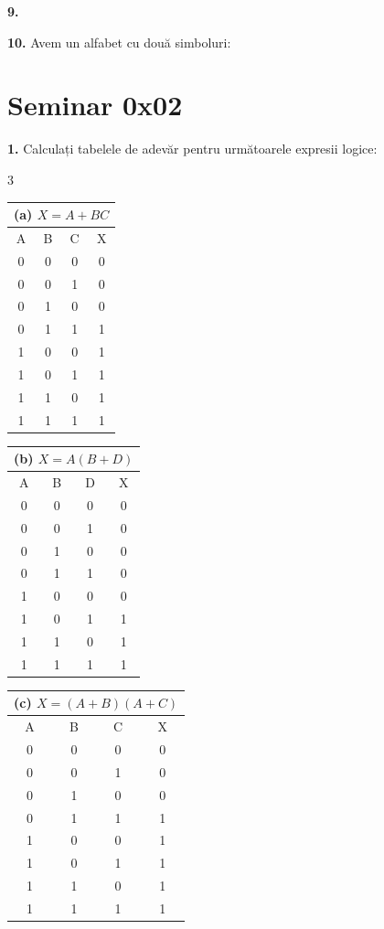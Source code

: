 \documentclass[a4paper]{article}
\renewcommand{\arraystretch}{1.4}
\newenvironment{definition}[1]
    {\begin{definitionbox}[frametitle={#1}]}
    {\end{definitionbox}}
\begin{document}
\textbf{9.}


\textbf{10.} Avem un alfabet cu două simboluri:
%


\section{Seminar 0x02}
\textbf{1.} Calculați tabelele de adevăr pentru următoarele expresii logice:
\begin{multicols}{3}

\renewcommand{\arraystretch}{0.9}
\setlength{\tabcolsep}{6pt}
\centering

\begin{tabular}{|c|c|c||c|}
\multicolumn{4}{|c|}{(a) $X = A + BC$} \\ \hline
A & B & C & X \\ \hline
0 & 0 & 0 & 0 \\ \hline
0 & 0 & 1 & 0 \\ \hline
0 & 1 & 0 & 0 \\ \hline
0 & 1 & 1 & 1 \\ \hline
1 & 0 & 0 & 1 \\ \hline
1 & 0 & 1 & 1 \\ \hline
1 & 1 & 0 & 1 \\ \hline
1 & 1 & 1 & 1 \\ \hline
\end{tabular}

\begin{tabular}{|c|c|c||c|}
\multicolumn{4}{|c|}{(b) $X = A(B + D)$} \\ \hline
A & B & D & X \\ \hline
0 & 0 & 0 & 0 \\ \hline
0 & 0 & 1 & 0 \\ \hline
0 & 1 & 0 & 0 \\ \hline
0 & 1 & 1 & 0 \\ \hline
1 & 0 & 0 & 0 \\ \hline
1 & 0 & 1 & 1 \\ \hline
1 & 1 & 0 & 1 \\ \hline
1 & 1 & 1 & 1 \\ \hline
\end{tabular}

\begin{tabular}{|c|c|c||c|}
\multicolumn{4}{|c|}{(c) $X = (A + B)(A + C)$} \\ \hline
A & B & C & X \\ \hline
0 & 0 & 0 & 0 \\ \hline
0 & 0 & 1 & 0 \\ \hline
0 & 1 & 0 & 0 \\ \hline
0 & 1 & 1 & 1 \\ \hline
1 & 0 & 0 & 1 \\ \hline
1 & 0 & 1 & 1 \\ \hline
1 & 1 & 0 & 1 \\ \hline
1 & 1 & 1 & 1 \\ \hline
\end{tabular}


\end{multicols}
\end{document}
